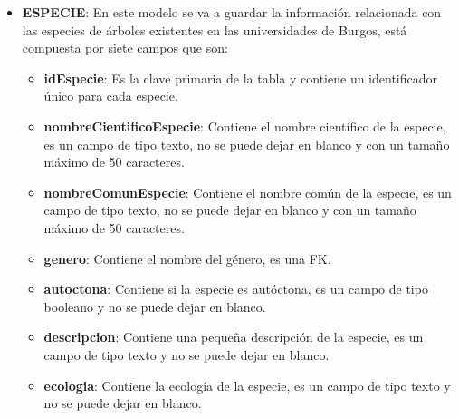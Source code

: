 
\begin{itemize}
	\item \textbf{ESPECIE}: En este modelo se va a guardar la información relacionada con las especies de árboles existentes en las universidades de Burgos, está compuesta por siete campos que son:
	\begin{itemize}
		\item \textbf{idEspecie}: Es la clave primaria de la tabla y contiene un identificador único para cada especie.
		\item \textbf{nombreCientificoEspecie}: Contiene el nombre científico de la especie, es un campo de tipo texto, no se puede dejar en blanco y con un tamaño máximo de 50 caracteres.
		\item \textbf{nombreComunEspecie}: Contiene el nombre común de la especie, es un campo de tipo texto, no se puede dejar en blanco y con un tamaño máximo de 50 caracteres.
		\item \textbf{genero}: Contiene el nombre del género, es una FK.
		\item \textbf{autoctona}: Contiene si la especie es autóctona, es un campo de tipo booleano y no se puede dejar en blanco.
		\item \textbf{descripcion}: Contiene una pequeña descripción de la especie, es un campo de tipo texto y no se puede dejar en blanco.
		\item \textbf{ecologia}: Contiene la ecología de la especie, es un campo de tipo texto y no se puede dejar en blanco.
	\end{itemize}
\end{itemize}


